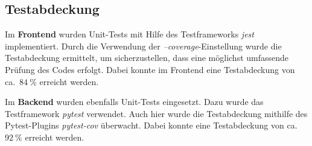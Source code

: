 \subsection{Testabdeckung}
Im \textbf{Frontend} wurden Unit-Tests mit Hilfe des Testframeworks \textit{jest}\cite{jest} implementiert. Durch die Verwendung der \textit{--coverage}-Einstellung wurde die Testabdeckung ermittelt, um sicherzustellen, dass eine möglichst umfassende Prüfung des Codes erfolgt. Dabei konnte im Frontend eine Testabdeckung von ca.~$84~\%$ erreicht werden.

Im \textbf{Backend} wurden ebenfalls Unit-Tests eingesetzt. Dazu wurde das Testframework \textit{pytest}\cite{pytest} verwendet. Auch hier wurde die Testabdeckung mithilfe des Pytest-Plugins \textit{pytest-cov} überwacht\cite{pytest-cov}. Dabei konnte eine Testabdeckung von ca.~$92~\%$ erreicht werden.